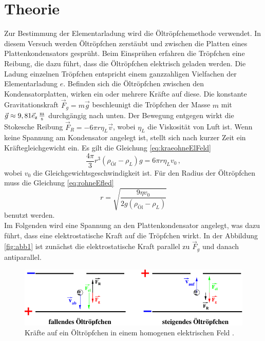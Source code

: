 \section{Theorie}
\label{sec:Theorie}

Zur Bestimmung der Elementarladung wird die Öltröpfchemethode verwendet. In diesem Versuch werden Öltröpfchen zerstäubt und zwischen die Platten eines Plattenkondensators gesprüht.
Beim Einsprühen erfahren die Tröpfchen eine Reibung, die dazu führt, dass die Öltröpfchen elektrisch geladen werden.
Die Ladung einzelnen Tröpfchen entspricht einem ganzzahligen Vielfachen der Elementarladung $e$.
Befinden sich die Öltröpfchen zwischen den Kondensatorplatten, wirken ein oder mehrere Kräfte auf diese. 
Die konstante Gravitationskraft $\vec{F}_g = m \vec{g}$ beschleunigt die Tröpfchen der Masse $m$ mit $\vec{g} \approx 9,81 \vec{e}_\text{z} \,\si{\frac{\meter}{\second}}$ durchgängig nach unten.
Der Bewegung entgegen wirkt die Stokesche Reibung $\vec{F}_R = -6 \pi r \eta_L \vec{v}$, wobei $\eta_L$ die Viskosität von Luft ist.
Wenn keine Spannung am Kondensator angelegt ist, stellt sich nach kurzer Zeit ein Kräftegleichgewicht ein.
Es gilt die Gleichung \eqref{eq:kraeohneElFeld}
\begin{equation}
    \frac{4 \pi}{3} r^3(\rho_{Öl} - \rho_L)g = 6 \pi r \eta_L v_0 \, ,
    \label{eq:kraeohneElFeld}
\end{equation}
wobei $v_0$ die Gleichgewichtsgeschwindigkeit ist. Für den Radius der Öltröpfchen muss die Gleichung \eqref{eq:rohneEfled}
\begin{equation}
    r = \sqrt{\frac{9 \eta v_0}{2 g (\rho_\text{Öl} - \rho_L)}}
    \label{eq:rohneEfled}
\end{equation}
benutzt werden.\\

Im Folgenden wird eine Spannung an den Plattenkondensator angelegt, was dazu führt, dass eine elektrostatische Kraft auf die Tröpfchen wirkt.
In der Abbildung \autoref{fig:abb1} ist zunächst die elektrostatische Kraft parallel zu $\vec{F}_g$ und danach antiparallel.


\begin{figure}[H]
    \centering
    \includegraphics{figures/Abb1.pdf}
    \caption{Kräfte auf ein Öltröpfchen in einem homogenen elektrischen Feld \cite{ap12}.}
    \label{fig:abb1}
\end{figure}


